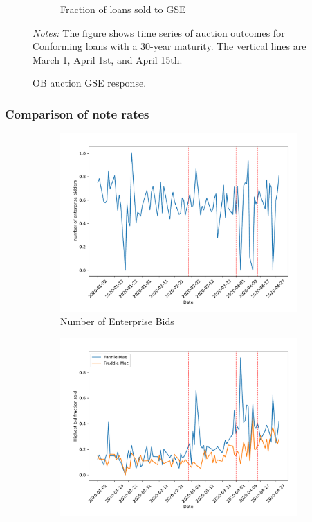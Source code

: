 \documentclass[11pt,a4paper]{article}
\begin{document}
\begin{figure}[h]
\begin{subfigure}[b]{0.49\textwidth}
      \caption{ Fraction of loans sold to GSE}
     \end{subfigure}
     \caption{OB auction  GSE response. } 
   \begin{minipage}{\textwidth}
      \footnotesize{\textit{Notes:} The figure shows time series of auction outcomes for Conforming loans with a 30-year maturity. The vertical lines are March 1, April 1st, and April 15th.  } 
      \end{minipage}
\end{figure}


\pagebreak
\subsubsection{Comparison of note rates}

\begin{figure}[h]
  \centering
  \begin{subfigure}[b]{0.49\textwidth}
      \includegraphics[width=0.998\textwidth]{../results/figures/Number of Enterprise Bidders_mean_mat30_loan1_timeseries_nr_3_3.75.pdf}
      \caption{Number of Enterprise Bids}
     \end{subfigure}
     \begin{subfigure}[b]{0.49\textwidth}
      \includegraphics[width=0.998\textwidth]{../results/figures/sold_FreddieBid_mean_mat30_loan1_timeseries_nr_3_3.75.pdf}

\end{subfigure}
\end{figure}
\end{document}
